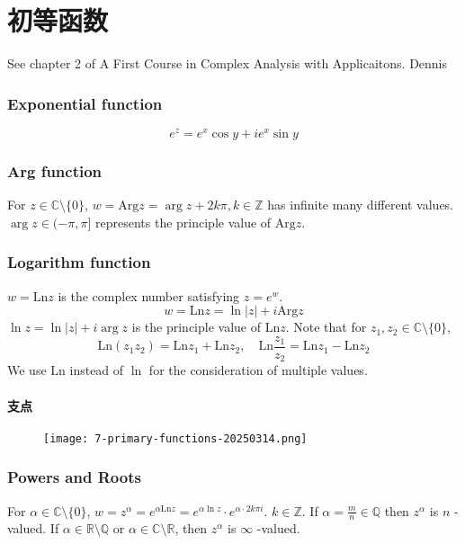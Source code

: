 \section{初等函数}

See chapter 2 of  A First Course in Complex Analysis with Applicaitons. Dennis

\subsubsection{Exponential function}
\[
e^{ z }=e^{ x }\cos y+ie^{ x }\sin y
\]
\subsubsection{Arg function}

For $z\in \mathbb{C}\setminus \{ 0 \}$, $w=\mathrm{Arg}z=\arg z+2k\pi, k\in \mathbb{Z}$ has infinite many different values. $\arg z\in(-\pi,\pi]$ represents the principle value of $\mathrm{Arg}z$.

\subsubsection{Logarithm function}

$w=\mathrm{Ln}z$ is the complex number satisfying $z=e^{ w }$.
\[
w=\mathrm{Ln}z=\ln \lvert z \rvert +i\mathrm{Arg}z
\]
$\ln z=\ln \lvert z \rvert+i\arg z$ is the principle value of $\mathrm{Ln}z$.
Note that for $z_1, z_2\in \mathbb{C}\setminus \{ 0 \}$,
\[
\mathrm{Ln}(z_1z_2)=\mathrm{Ln}z_1+\mathrm{Ln}z_2,\quad \mathrm{Ln}\frac{z_1}{z_2}=\mathrm{Ln}z_1-\mathrm{Ln}z_2
\]
We use $\mathrm{Ln}$ instead of $\ln$ for the consideration of multiple values.

\paragraph{支点}

\begin{figure}[H]
\centering
\texttt{[image: 7-primary-functions-20250314.png]}
\label{}
\end{figure}

\subsubsection{Powers and Roots}

For $\alpha\in \mathbb{C}\setminus \{ 0 \}$, $w=z^{\alpha}=e^{ \alpha \mathrm{Ln}z }=e^{ \alpha \ln z }\cdot e^{ \alpha \cdot2k\pi i }$. $k\in \mathbb{Z}$. If $\alpha=\frac{m}{n}\in \mathbb{Q}$ then $z^{\alpha}$ is $n$ -valued. If $\alpha\in \mathbb{R}\setminus \mathbb{Q}$ or $\alpha\in \mathbb{C}\setminus \mathbb{R}$, then $z^{\alpha}$ is $\infty$ -valued.

